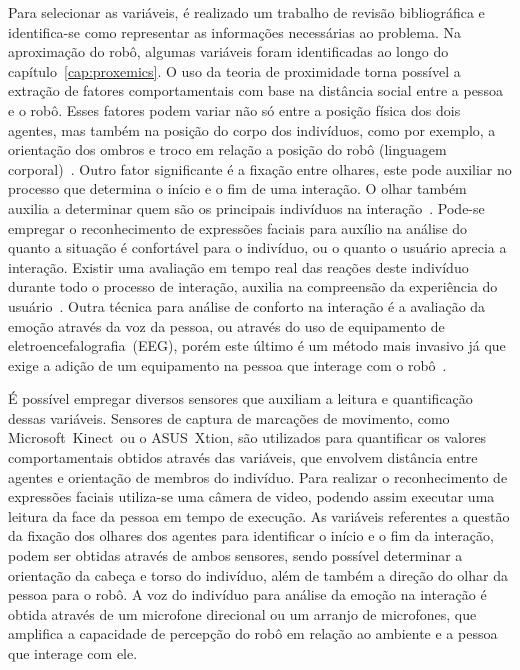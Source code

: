 Para selecionar as variáveis, é realizado um trabalho de revisão bibliográfica e identifica-se como representar as informações necessárias ao problema. Na aproximação do robô, algumas variáveis foram identificadas ao longo do capítulo~\ref{cap:proxemics}. O uso da teoria de proximidade torna possível a extração de fatores comportamentais com base na distância social entre a pessoa e o robô. Esses fatores podem variar não só entre a posição física dos dois agentes, mas também na posição do corpo dos indivíduos, como por exemplo, a orientação dos ombros e troco em relação a posição do robô (linguagem corporal)~\cite{mead:2016}. Outro fator significante é a fixação entre olhares, este pode auxiliar no processo que determina o início e o fim de uma interação. O olhar também auxilia a determinar quem são os principais indivíduos na interação~\cite{mumm:2011, srinivasan:2012}. Pode-se empregar o reconhecimento de expressões faciais para auxílio na análise do quanto a situação é confortável para o indivíduo, ou o quanto o usuário aprecia a interação. Existir uma avaliação em tempo real das reações deste indivíduo durante todo o processo de interação, auxilia na compreensão da experiência do usuário~\cite{amaral:2014}. Outra técnica para análise de conforto na interação é a avaliação da emoção através da voz da pessoa, ou através do uso de equipamento de eletroencefalografia~(EEG), porém este último é um método mais invasivo já que exige a adição de um equipamento na pessoa que interage com o robô~\cite{bos:2006, lee:2014}.

É possível empregar diversos sensores que auxiliam a leitura e quantificação dessas variáveis. Sensores de captura de marcações de movimento, como Microsoft\textregistered\ Kinect\textregistered\ ou o ASUS\textregistered\ Xtion\textregistered, são utilizados para quantificar os valores comportamentais obtidos através das variáveis, que envolvem distância entre agentes e orientação de membros do indivíduo. Para realizar o reconhecimento de expressões faciais utiliza-se uma câmera de video, podendo assim executar uma leitura da face da pessoa em tempo de execução. As variáveis referentes a questão da fixação dos olhares dos agentes para identificar o início e o fim da interação, podem ser obtidas através de ambos sensores, sendo possível determinar a orientação da cabeça e torso do indivíduo, além de também a direção do olhar da pessoa para o robô. A voz do indivíduo para análise da emoção na interação é obtida através de um microfone direcional ou um arranjo de microfones, que amplifica a capacidade de percepção do robô em relação ao ambiente e a pessoa que interage com ele.

